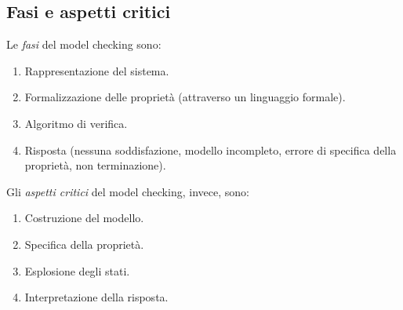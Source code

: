 \documentclass[a4paper,oneside,titlepage]{book}
\begin{document}
\subsection{Fasi e aspetti critici}
Le \textit{fasi} del model checking sono:
\begin{enumerate}
    \item Rappresentazione del sistema.
    \item Formalizzazione delle proprietà (attraverso un linguaggio formale).
    \item Algoritmo di verifica.
    \item Risposta (nessuna soddisfazione, modello incompleto, errore di specifica della proprietà, non terminazione).
\end{enumerate}
Gli \textit{aspetti critici} del model checking, invece, sono:
\begin{enumerate}
    \item Costruzione del modello.
    \item Specifica della proprietà.
    \item Esplosione degli stati.
    \item Interpretazione della risposta.
\end{enumerate}
\end{document}
